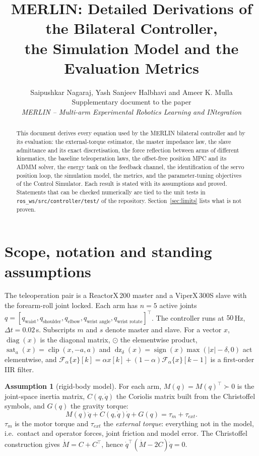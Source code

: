 \documentclass[11pt,a4paper]{article}
\title{\textbf{MERLIN: Detailed Derivations of the Bilateral Controller,\\the Simulation Model and the Evaluation Metrics}}
\author{Saipushkar Nagaraj, Yash Sanjeev Halbhavi and Ameer K. Mulla\\[2pt]\small Supplementary document to the paper\\\small\emph{MERLIN -- Multi-arm Experimental Robotics Learning and INtegration}}
\date{}
\theoremstyle{remark}
\theoremstyle{definition}
\newtheorem{assumption}{Assumption}
\newcommand{\diag}{\operatorname{diag}}
\newcommand{\dz}{\operatorname{dz}}
\newcommand{\sat}{\operatorname{sat}}
\newcommand{\clip}{\operatorname{clip}}
\newcommand{\sign}{\operatorname{sign}}
\begin{document}
\maketitle

\begin{abstract}\noindent
This document derives every equation used by the MERLIN bilateral controller and by its evaluation: the external-torque estimator, the master impedance law, the slave admittance and its exact discretisation, the force reflection between arms of different kinematics, the baseline teleoperation laws, the offset-free position MPC and its ADMM solver, the energy tank on the feedback channel, the identification of the servo position loop, the simulation model, the metrics, and the parameter-tuning objectives of the Control Simulator. Each result is stated with its assumptions and proved. Statements that can be checked numerically are tied to the unit tests in \texttt{ros\_ws/src/controller/test/} of the repository. Section~\ref{sec:limits} lists what is not proven.
\end{abstract}

\tableofcontents

\section{Scope, notation and standing assumptions}\label{sec:scope}
The teleoperation pair is a ReactorX\,200 master and a ViperX\,300S slave with the forearm-roll joint locked. Each arm has $n=5$ active joints
$q=[q_{\text{waist}},q_{\text{shoulder}},q_{\text{elbow}},q_{\text{wrist angle}},q_{\text{wrist rotate}}]^\top$.
The controller runs at $50$\,Hz, $\Delta t=0.02$\,s. Subscripts $m$ and $s$ denote master and slave. For a vector $x$, $\diag(x)$ is the diagonal matrix,
$\odot$ the elementwise product, $\sat_a(x)=\clip(x,-a,a)$ and $\dz_\delta(x)=\sign(x)\max(|x|-\delta,0)$ act elementwise, and
$\mathcal F_\alpha\{x\}[k]=\alpha x[k]+(1-\alpha)\mathcal F_\alpha\{x\}[k-1]$ is a first-order IIR filter.

\begin{assumption}[rigid-body model]\label{as:rb}
For each arm, $M(q)=M(q)^\top\succ0$ is the joint-space inertia matrix, $C(q,\dot q)$ the Coriolis matrix built from the Christoffel symbols, and $G(q)$ the gravity torque:
\begin{equation}\label{eq:dyn}
M(q)\ddot q+C(q,\dot q)\dot q+G(q)=\tau_m+\tau_{ext}.
\end{equation}
$\tau_m$ is the motor torque and $\tau_{ext}$ the \emph{external torque}: everything not in the model, i.e.\ contact and operator forces, joint friction and model error.
The Christoffel construction gives $\dot M=C+C^\top$, hence $\dot q^\top(\dot M-2C)\dot q=0$.
\end{assumption}
\end{document}
